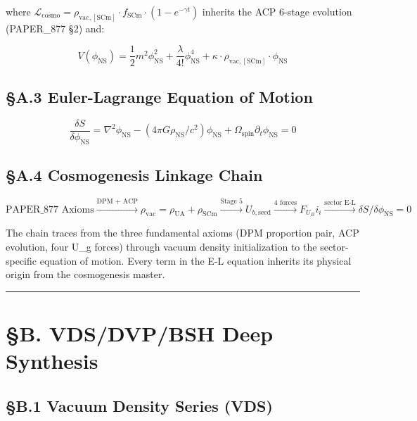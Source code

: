 \documentclass[12pt,a4paper]{article}
\begin{document}
where $\mathcal{L}_{\mathrm{cosmo}} = \rho_{\mathrm{vac,[SCm]}} \cdot f_{\mathrm{SCm}} \cdot (1 - e^{-\gamma t})$ inherits the ACP 6-stage evolution (PAPER\_877 \S{}2) and:

\begin{equation}
V(\phi_{\mathrm{NS}}) = \frac{1}{2} m^2 \phi_{\mathrm{NS}}^2 + \frac{\lambda}{4!} \phi_{\mathrm{NS}}^4 + \kappa \cdot \rho_{\mathrm{vac,[SCm]}} \cdot \phi_{\mathrm{NS}}
\end{equation}

\subsection{\S{}A.3 Euler-Lagrange Equation of Motion}

\begin{equation}
\boxed{\frac{\delta S}{\delta \phi_{\mathrm{NS}}} = \nabla^2 \phi_{\mathrm{NS}} - (4\pi G \rho_{\mathrm{NS}}/c^2)\phi_{\mathrm{NS}} + \Omega_{\mathrm{spin}} \partial_t \phi_{\mathrm{NS}} = 0}
\end{equation}

\subsection{\S{}A.4 Cosmogenesis Linkage Chain}

\begin{equation}
\text{PAPER\_877 Axioms} \xrightarrow{\text{DPM + ACP}} \rho_{\mathrm{vac}} = \rho_{\mathrm{UA}} + \rho_{\mathrm{SCm}} \xrightarrow{\text{Stage 5}} U_{b,\mathrm{seed}} \xrightarrow{\text{4 forces}} F_U_Bi_i \xrightarrow{\text{sector E-L}} \delta S/\delta \phi_{\mathrm{NS}} = 0
\end{equation}

The chain traces from the three fundamental axioms (DPM proportion pair, ACP evolution, four U\_g forces) through vacuum density initialization to the sector-specific equation of motion. Every term in the E-L equation inherits its physical origin from the cosmogenesis master.

\medskip\hrule\medskip

\section{\S{}B. VDS/DVP/BSH Deep Synthesis}

\subsection{\S{}B.1 Vacuum Density Series (VDS)}
\end{document}
